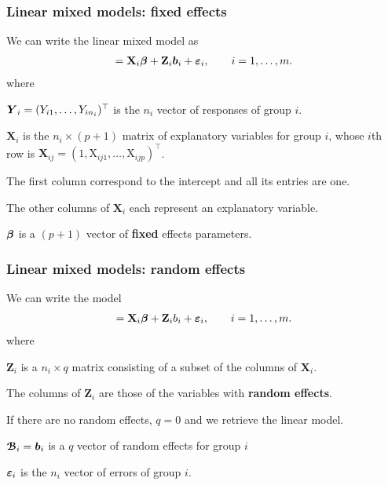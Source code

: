 \documentclass{beamer}
\begin{document}
\begin{frame}\frametitle{Linear mixed models: fixed effects}


We can write the linear mixed model as
\begin{align*}
[\bs{Y}_i \mid \bs{\mathcal{B}}_i=\bs{b}_i]= \mathbf{X}_i \bs{\beta} + \mathbf{Z}_i \bs{b}_i + \bs{\eps}_i, \qquad i = 1, \ldots, m.
\end{align*} 
where
\bi
\item $\boldsymbol {Y}_i=(Y_{i1},\ldots,Y_{in_i})^{\top}$ is the $n_i$ vector of responses of group $i$.

\item $\mathbf{X}_i$ is the $n_i \times (p+1)$ matrix of explanatory variables for group $i$, whose $i$th row is $\mathbf{X}_{ij}=(1,\mathrm{X}_{ij1},\ldots,\mathrm{X}_{ijp})^{\top}$. 
\bi 
\item The first column correspond to the intercept and all its entries are one.
\item The other columns of $\mathbf{X}_i$ each represent an explanatory variable.
\ei
\item $\boldsymbol {\beta}$ is a $(p+1)$ vector of \textbf{fixed} effects parameters.
\ei


\end{frame}

\begin{frame}\frametitle{Linear mixed models: random effects}
We can write the model
\begin{align*}
[\bs{Y}_i \mid \bs{\mathcal{B}}_i=\bs{b}_i]= \mathbf{X}_i \bs{\beta} + \mathbf{Z}_i b_i + \bs{\eps}_i, \qquad i = 1, \ldots, m.
\end{align*} 
where
\bi
\item $\mathbf{Z}_i$ is a $n_i \times q$ matrix consisting of a subset of the columns of $\mathbf{X}_i$. 
\bi \item The columns of $\mathbf{Z}_i$ are those of the variables with \textbf{random effects}. 
\item If there are no random effects, $q=0$ and we retrieve the linear model.
\ei
\item  $\boldsymbol {\mathcal{B}}_i=\boldsymbol {b}_i$ is a $q$ vector of random effects for group $i$
\item $\boldsymbol {\varepsilon}_i$ is the $n_i$ vector of errors of group $i$.
\ei

\end{frame}
\end{document}
